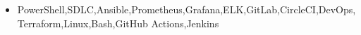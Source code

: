 \documentclass[10pt]{extarticle}
\begin{document}
\begin{itemize}
    
    
    \vspace{4pt}
    \item PowerShell,SDLC,Ansible,Prometheus,Grafana,ELK,GitLab,CircleCI,DevOps,Terraform,Linux,Bash,GitHub Actions,Jenkins
\end{itemize}
\end{document}
